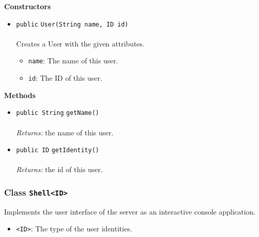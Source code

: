 \textbf{\sffamily Constructors}
\begin{itemize}
\item \lstinline|public| \lstinline|User|\lstinline|(String name, ID id)|\\ \\[-0.6em]
Creates a User with the given attributes.
\begin{itemize}
\item \lstinline|name|: The name of this user.
\item \lstinline|id|: The ID of this user.
\end{itemize}



\end{itemize}


\textbf{\sffamily Methods}
\begin{itemize}
\item \lstinline|public String| \lstinline|getName|\lstinline|()|\\ \\[-0.6em]
\emph{Returns:} the name of this user.



\item \lstinline|public ID| \lstinline|getIdentity|\lstinline|()|\\ \\[-0.6em]
\emph{Returns:} the id of this user.



\end{itemize}

\subsubsection{Class \lstinline|Shell<ID>|}
Implements the user interface of the server as an interactive console application. \\
\noindent\begin{minipage}[t]{5cm}
\vspace{0.3em}
\hspace*{2em}
\vspace{0.3em}
\end{minipage}

\begin{itemize}
\item \lstinline|<ID>|: The type of the user identities.
\end{itemize}



